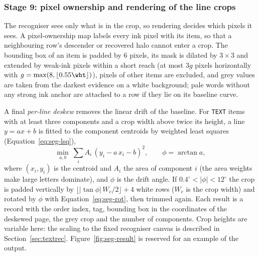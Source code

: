 \subsubsection{Stage 9: pixel ownership and rendering of the line crops}

The recogniser sees only what is in the crop, so rendering decides which pixels it sees. A pixel-ownership map labels every ink pixel with its item, so that a neighbouring row's descender or recovered halo cannot enter a crop. The bounding box of an item is padded by 6 pixels, its mask is dilated by $3\times3$ and extended by weak-ink pixels within a short reach (at most $3g$ pixels horizontally with $g=\max(8,\lfloor0.55\wht\rfloor)$), pixels of other items are excluded, and grey values are taken from the darkest evidence on a white background; pale words without any strong ink anchor are attached to a row if they lie on its baseline curve.

A final \emph{per-line deskew} removes the linear drift of the baseline.
For \texttt{TEXT} items with at least three components and a crop width above twice its height, a line $y=ax+b$ is fitted to the component centroids by weighted least squares (Equation~\ref{eq:seg-lsq}),
\begin{equation}
\min_{a,b}\ \sum_i A_i\,(y_i-a\,x_i-b)^2,\qquad \phi=\arctan a,
\label{eq:seg-lsq}
\end{equation}
where $(x_i,y_i)$ is the centroid and $A_i$ the area of component $i$ (the area weights make large letters dominate), and $\phi$ is the drift angle.
If $0.4^\circ<|\phi|<12^\circ$ the crop is padded vertically by $\lfloor|\tan\phi|\,W_c/2\rfloor+4$ white rows ($W_c$ is the crop width) and rotated by $\phi$ with Equation~\ref{eq:seg-rot}, then trimmed again.
Each result is a record with the order index, tag, bounding box in the coordinates of the deskewed page, the grey crop and the number of components.
Crop heights are variable here: the scaling to the fixed recogniser canvas is described in Section~\ref{sec:textrec}. Figure~\ref{fig:seg-result} is reserved for an example of the output.

\label{fig:seg-result}

